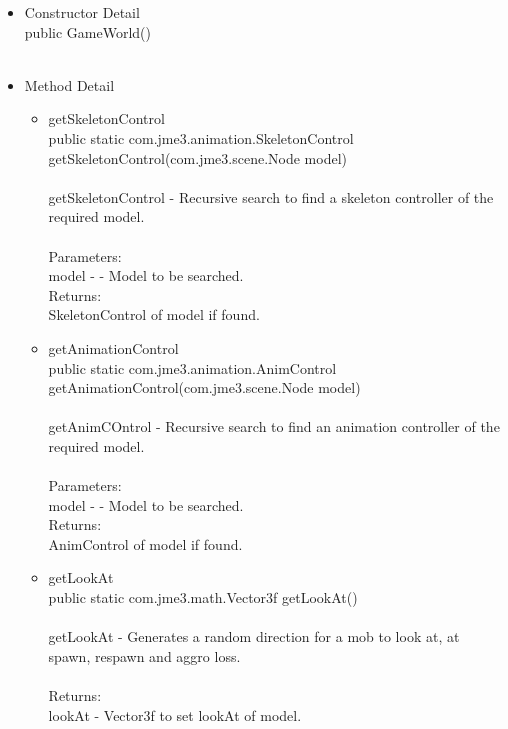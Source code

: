 \documentclass[letterpaper]{article}
\begin{document}
\begin{itemize}
										\item	Constructor Detail \\
												public GameWorld() \\ \\
										\item	Method Detail \\
												\begin{itemize}
													\item	getSkeletonControl \\
															public static com.jme3.animation.SkeletonControl \\ getSkeletonControl(com.jme3.scene.Node model) \\ \\
															getSkeletonControl - Recursive search to find a skeleton controller of the required model. \\ \\
															Parameters: \\
															model - - Model to be searched. \\
															Returns: \\
															SkeletonControl of model if found.
													\item	getAnimationControl \\
															public static com.jme3.animation.AnimControl getAnimationControl(com.jme3.scene.Node model) \\ \\
															getAnimCOntrol - Recursive search to find an animation controller of the required model. \\ \\
															Parameters: \\
															model - - Model to be searched. \\
															Returns: \\
															AnimControl of model if found. \\
													\item	getLookAt \\
															public static com.jme3.math.Vector3f getLookAt() \\ \\
															getLookAt - Generates a random direction for a mob to look at, at spawn, respawn and aggro loss. \\ \\
															Returns: \\
															lookAt - Vector3f to set lookAt of model. \\

\end{itemize}
\end{itemize}
\end{document}
